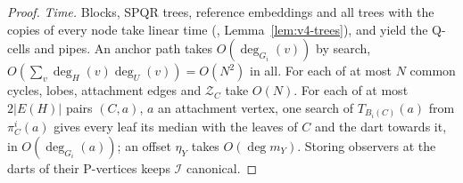 \begin{proof}
\emph{Time.} Blocks, SPQR trees, reference embeddings and all trees with the
copies of every node take linear time (\cite{Tar72,HT73,HT74,GM01},
Lemma~\ref{lem:v4-trees}), and yield the Q-cells and pipes. An anchor path
takes $O(\deg_{G_i}(v))$ by search, $O(\sum_v\deg_H(v)\deg_U(v))=O(N^2)$ in
all. For each of at most $N$ common cycles, lobes, attachment edges and
$\mathcal Z_C$ take $O(N)$. For each of at most $2|E(H)|$ pairs $(C,a)$, $a$
an attachment vertex, one search of $T_{B_i(C)}(a)$ from $\pi^i_C(a)$ gives
every leaf its median with the leaves of $C$ and the dart towards it, in
$O(\deg_{G_i}(a))$; an offset $\eta_Y$ takes $O(\deg m_Y)$. Storing observers
at the darts of their P-vertices keeps $\mathcal I$ canonical.
\end{proof}
